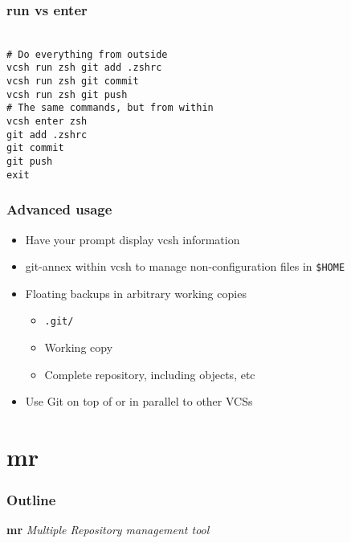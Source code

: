 \documentclass[t]{beamer}
\begin{document}
\begin{frame}
	\frametitle{run vs enter}
	\texttt{ \\
		\# Do everything from outside \\
		vcsh run zsh git add .zshrc \\
		vcsh run zsh git commit \\
		vcsh run zsh git push \\
		\# The same commands, but from within\\
		vcsh enter zsh \\
		git add .zshrc \\
		git commit \\
		git push \\
		exit
	}
\end{frame}

\begin{frame}
	\frametitle{Advanced usage}
	\begin{itemize}
		\item Have your prompt display vcsh information
		\item git-annex within vcsh to manage non-configuration files in \texttt{\$HOME}
		\item Floating backups in arbitrary working copies
		\begin{itemize}
			\item \texttt{.git/}
			\item Working copy
			\item Complete repository, including objects, etc
		\end{itemize}
		\item Use Git on top of or in parallel to other VCSs
	\end{itemize}
\end{frame}


\section{mr}

\begin{frame}
	\frametitle{Outline}
	\tableofcontents[currentsection]
\end{frame}

\begin{frame}
		\begin{center}
			\vfill
			\vfill
			\textbf{mr}
			\vfill
			\textit{Multiple Repository management tool}
			\vfill
			\vfill
		\end{center}
\end{frame}
\end{document}
